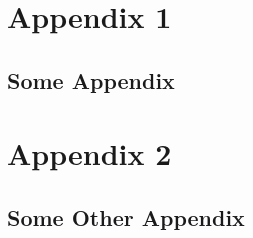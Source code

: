 \documentclass{upcthesis}
\begin{document}


\begin{generalappendices}
	\section{Appendix 1}
	\subsection{Some Appendix}
	\lipsum[11]
	\section{Appendix 2}
	\subsection{Some Other Appendix}
\end{generalappendices}
\end{document}
